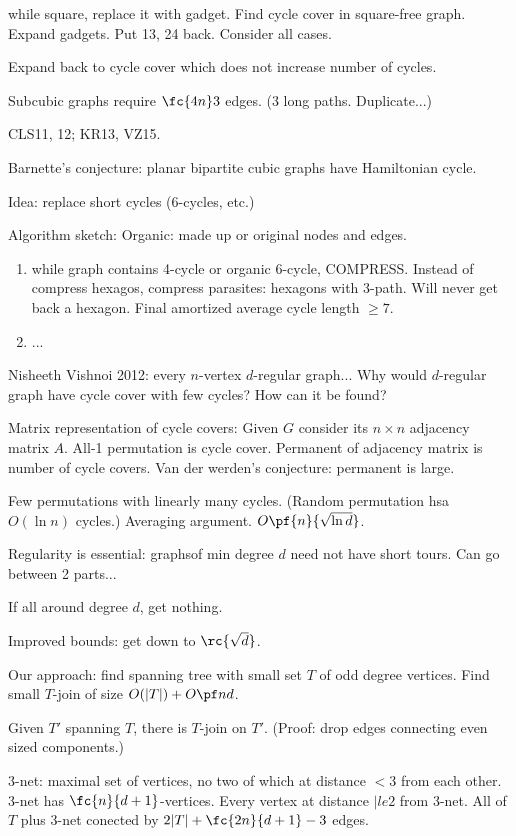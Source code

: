 while square, replace it with gadget. Find cycle cover in square-free graph. Expand gadgets. Put 13, 24 back. Consider all cases.

Expand back to cycle cover which does not increase number of cycles.

Subcubic graphs require $\fc{4n}3$ edges. (3 long paths. Duplicate...)

CLS11, 12; KR13, VZ15.

Barnette's conjecture: planar bipartite cubic graphs have Hamiltonian cycle.

Idea: replace short cycles (6-cycles, etc.)

Algorithm sketch: 
Organic: made up or original nodes and edges.
\begin{enumerate}
\item
while graph contains 4-cycle or organic 6-cycle, COMPRESS.
Instead of compress hexagos, compress parasites: hexagons with 3-path. Will never get back a hexagon.
Final amortized average cycle length $\ge 7$.
\item
...
\end{enumerate}

Nisheeth Vishnoi 2012: every $n$-vertex $d$-regular graph... 
Why would $d$-regular graph have cycle cover with few cycles? How can it be found?

Matrix representation of cycle covers: Given $G$ consider its $n\times n$ adjacency matrix $A$. All-1 permutation is cycle cover. Permanent of adjacency matrix is number of cycle covers. Van der werden's conjecture: permanent is large.

Few permutations with linearly many cycles. (Random permutation hsa $O(\ln n)$ cycles.) Averaging argument. $O\pf{n}{\sqrt{\ln d}}$.

Regularity is essential: graphsof min degree $d$ need not have short tours. Can go between 2 parts...

If all around degree $d$, get nothing.

Improved bounds: get down to $\rc{\sqrt d}$. 

Our approach: find spanning tree with small set $T$ of odd degree vertices. Find small $T$-join of size $O(|T|)+O\pf nd$.

Given $T'$ spanning $T$, there is $T$-join on $T'$. (Proof: drop edges connecting even sized components.)

3-net: maximal set of vertices, no two of which at distance $<3$ from each other. 3-net has $\fc{n}{d+1}$-vertices. Every vertex at distance $|le 2$ from 3-net. All of $T$ plus 3-net conected by $2|T|+\fc{2n}{d+1}-3$ edges.

